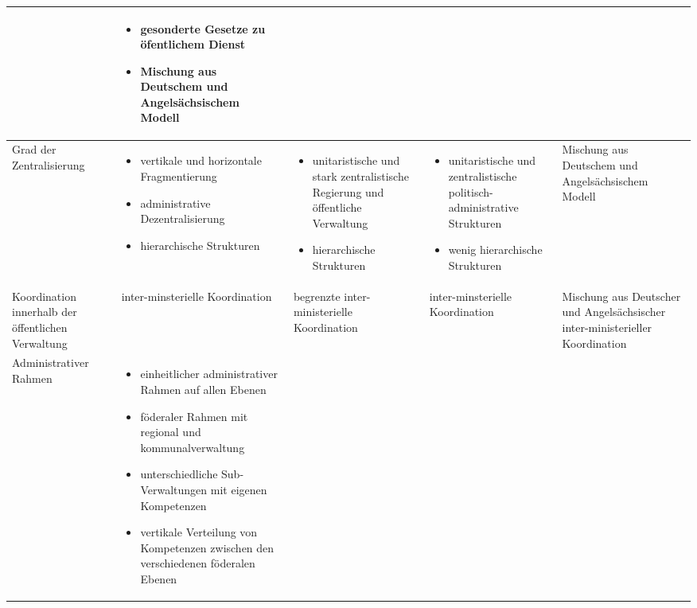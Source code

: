 \begin{landscape}
\begin{table}[!hbt]
\begin{tabular}{|L{4cm}|L{5cm}|L{5cm}|L{5cm}|L{5cm}|}
&
\begin{itemize}
\item gesonderte Gesetze zu öfentlichem Dienst            
\item Mischung aus Deutschem und Angelsächsischem Modell
\end{itemize}\\\hline
Grad der Zentralisierung&
\begin{itemize}
\item vertikale und horizontale Fragmentierung
\item administrative Dezentralisierung
\item hierarchische Strukturen
\end{itemize}
&
\begin{itemize}
\item unitaristische und stark zentralistische Regierung und öffentliche Verwaltung
\item hierarchische Strukturen
\end{itemize}
 &
\begin{itemize}
\item unitaristische und zentralistische politisch-administrative Strukturen
\item wenig hierarchische Strukturen 	
\end{itemize}
&
Mischung aus Deutschem und Angelsächsischem Modell\\\hline
Koordination innerhalb der öffentlichen Verwaltung	&inter-minsterielle Koordination	&begrenzte inter-ministerielle Koordination&	inter-minsterielle Koordination&	Mischung aus Deutscher und Angelsächsischer inter-ministerieller Koordination\\\hline
Administrativer Rahmen	&
 \vspace{-2mm}
\begin{itemize}
\item einheitlicher administrativer Rahmen auf allen Ebenen
\item föderaler Rahmen mit regional und kommunalverwaltung
\item unterschiedliche Sub-Verwaltungen mit eigenen Kompetenzen
\item vertikale Verteilung von Kompetenzen zwischen den verschiedenen föderalen Ebenen
 \vspace{-2mm}\end{itemize}


\end{tabular}
\end{table}
\end{landscape}
